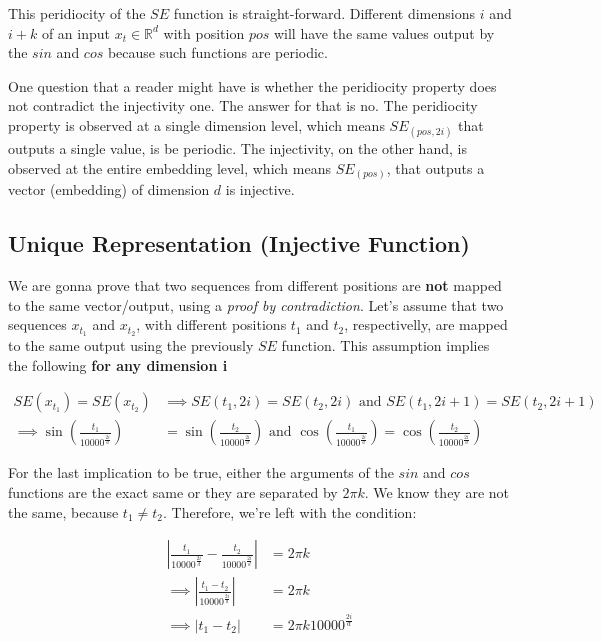 \documentclass{article}
\begin{document}
This peridiocity of the $SE$ function is straight-forward. Different dimensions $i$ and $i+k$ of an input  $x_t \in \mathbb{R}^{d}$ with position $pos$ will have the same values output by the $sin$ and $cos$ because such functions are periodic. 

\begin{info} %
	One question that a reader might have is whether the peridiocity property does not contradict the injectivity one. The answer for that is no. The peridiocity property is observed at a single dimension level, which means $SE_{(pos, 2i)}$ that outputs a single value, is be periodic. The injectivity, on the other hand, is observed at the entire embedding level, which means $SE_{(pos)}$, that outputs a vector (embedding) of dimension $d$ is injective.
\end{info}


\subsection{Unique Representation (Injective Function)}

We are gonna prove that two sequences from different positions are \textbf{not} mapped to the same vector/output, using a \textit{proof by contradiction}. 
Let's assume that two sequences $x_{t_1}$ and $x_{t_2}$, with different positions $t_1$ and $t_2$, respectivelly, are mapped to the same output using the previously  $SE$ function. This assumption implies the following \textbf{for any dimension i}

\begin{align}
	SE(x_{t_1}) = SE(x_{t_2}) & \implies SE(t_1, 2i) = SE(t_2, 2i) \text{   and   }SE(t_1, 2i+1) = SE(t_2, 2i+1) \\
	 \implies \sin\left(\frac{t_1}{10000^{\frac{2i}{d}}}\right) &= \sin\left(\frac{t_2}{10000^{\frac{2i}{d}}}\right) \text{   and   }\cos\left(\frac{t_1}{10000^{\frac{2i}{d}}}\right) = \cos\left(\frac{t_2}{10000^{\frac{2i}{d}}}\right) 
\end{align}


For the last implication to be true, either the arguments of the $sin$ and $cos$ functions are the exact same or they are separated by $2\pi k$. We know they are not the same, because $t_1 \neq t_2$. Therefore, we're left with the condition:


\begin{align}
	| \frac{t_1}{10000^{\frac{2i}{d}}} - \frac{t_2}{10000^{\frac{2i}{d}}} | &=  2\pi k \\
	\implies 	| \frac{t_1 - t_2}{10000^{\frac{2i}{d}}} | &=  2\pi k \\
	\implies 	| t_1 - t_2 | &=  2\pi k 10000^{\frac{2i}{d}} \\
\end{align}
\end{document}
